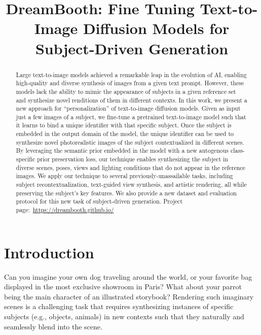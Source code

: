 \title{DreamBooth: Fine Tuning Text-to-Image Diffusion Models for Subject-Driven Generation}

\begin{abstract}
Large text-to-image models achieved a remarkable leap in the evolution of AI, enabling high-quality and diverse synthesis of images from a given text prompt. However, these models lack the ability to mimic the appearance of subjects in a given reference set and synthesize novel renditions of them in different contexts. In this work, we present a new approach for ``personalization'' of text-to-image diffusion models. Given as input just a few images of a subject, we fine-tune a pretrained text-to-image model such that it learns to bind a unique identifier with that specific subject. Once the subject is embedded in the output domain of the model, the unique identifier can be used to synthesize novel photorealistic images of the subject contextualized in different scenes. By leveraging the semantic prior embedded in the model with a new autogenous class-specific prior preservation loss, our technique enables synthesizing the subject in diverse scenes, poses, views and lighting conditions that do not appear in the reference images. We apply our technique to several previously-unassailable tasks, including subject recontextualization, text-guided view synthesis, and artistic rendering, all while preserving the subject's key features. We also provide a new dataset and evaluation protocol for this new task of subject-driven generation. Project page:~\small{\url{https://dreambooth.github.io/}}
\end{abstract}

\section{Introduction}

Can you imagine your own dog traveling around the world, or your favorite bag displayed in the most exclusive showroom in Paris? What about your parrot being the main character of an illustrated storybook? Rendering such imaginary scenes is a challenging task that requires synthesizing instances of specific subjects (e.g., objects, animals) in new contexts such that they naturally and seamlessly blend into the scene.

